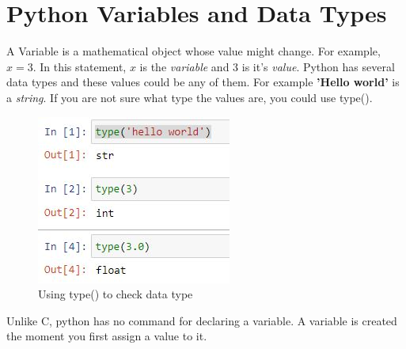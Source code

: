 \chapter{Python Variables and Data Types}
A Variable is a mathematical object whose value might change. For example, $x=3$. In this statement, $x$ is the \textit{variable} and 3 is it's \textit{value}. Python has several data types and these values could be any of them. For example \textbf{'Hello world'} is a \textit{string}. If you are not sure what type the values are, you could use type().
\begin{figure}[ht]
	\centering
	\includegraphics{"Assets/Images/data type/type"}
	\caption{Using type() to check data type}
	\label{fig:type()}
\end{figure}

\noindent Unlike C, python has no command for declaring a variable. A variable is created the moment you first assign a value to it.